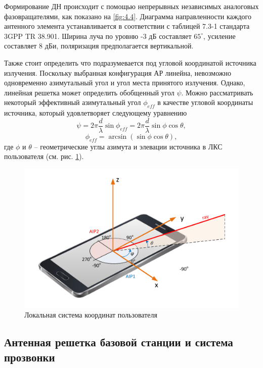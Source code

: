 Формирование ДН происходит с помощью непрерывных независимых аналоговых фазовращателями, как показано
на \ref{fig:4.4}.  Диаграмма направленности каждого антенного элемента устанавливается в
соответствии с таблицей 7.3-1 стандарта 3GPP TR 38.901. Ширина луча по уровню -3
дБ составляет $65^\circ$, усиление составляет 8 дБи, поляризация предполагается вертикальной.





Также стоит определить что подразумевается под угловой координатой источника
излучения.  Поскольку выбранная конфигурация АР линейна, невозможно одновременно
азимутальный угол и угол места принятого излучения.  Однако, линейная решетка
может определить обобщенный угол $\psi$. Можно рассматривать некоторый
эффективный азимутальный угол $\phi_{eff}$ в качестве угловой координаты
источника, который удовлетворяет следующему уравнению
\begin{equation}
    \label{eq:4.1}
    \psi = 2\pi \frac{d}{\lambda} \sin \phi_{eff} = 2\pi \frac{d}{\lambda} \sin\phi \cos{\theta},
\end{equation}
\begin{equation}
    \label{eq:4.2}
    \phi_{eff} = \arcsin(\sin \phi \cos \theta),
\end{equation}
где $\phi$ и $\theta$ -- геометрические углы азимута и элевации источника в ЛКС
пользователя (см. рис. \ref{fig:4.5}).

\begin{figure}[ht]
    \centering
    \includegraphics[width=0.75\linewidth]{figs/fig4.5}
    \caption{Локальная система координат пользователя}
    \label{fig:4.5}
\end{figure}

\subsection{Антенная решетка базовой станции и система прозвонки}

